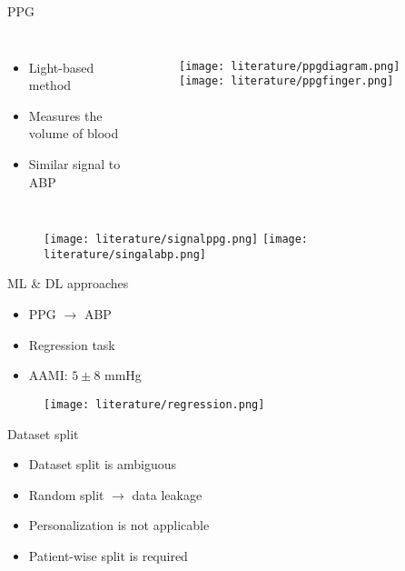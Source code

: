 \begin{frame}{PPG}
    \begin{columns}
        \begin{itemize}
            \item Light-based method
            \item Measures the volume of blood
            \item Similar signal to ABP
        \end{itemize}

        \begin{figure}
            \texttt{[image: literature/ppgdiagram.png]}
            \texttt{[image: literature/ppgfinger.png]}
        \end{figure}
    \end{columns}
    \begin{figure}
        \texttt{[image: literature/signalppg.png]}
        \texttt{[image: literature/singalabp.png]}
    \end{figure}

\end{frame}

\begin{frame}{ML \& DL approaches}
    \begin{itemize}
        \item PPG $\to$ ABP
        \item Regression task
        \item AAMI: $5\pm8$ mmHg
    \end{itemize}
    \begin{figure}
        \texttt{[image: literature/regression.png]}
    \end{figure}
\end{frame}

\begin{frame}{Dataset split}
    \begin{itemize}
        \item Dataset split is ambiguous
        \item Random split $\to$ data leakage
        \item Personalization is not applicable
        \item Patient-wise split is required
    \end{itemize}
    \begin{figure}
        
    \end{figure}
\end{frame}

